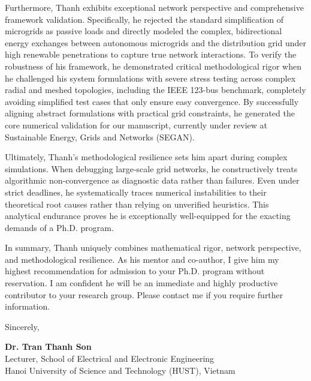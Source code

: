 \documentclass[11pt,letterpaper]{article}
\begin{document}
Furthermore, Thanh exhibits exceptional network perspective and comprehensive framework validation. Specifically, he rejected the standard simplification of microgrids as passive loads and directly modeled the complex, bidirectional energy exchanges between autonomous microgrids and the distribution grid under high renewable penetrations to capture true network interactions. To verify the robustness of his framework, he demonstrated critical methodological rigor when he challenged his system formulations with severe stress testing across complex radial and meshed topologies, including the IEEE 123-bus benchmark, completely avoiding simplified test cases that only ensure easy convergence. By successfully aligning abstract formulations with practical grid constraints, he generated the core numerical validation for our manuscript, currently under review at Sustainable Energy, Grids and Networks (SEGAN).

Ultimately, Thanh's methodological resilience sets him apart during complex simulations. When debugging large-scale grid networks, he constructively treats algorithmic non-convergence as diagnostic data rather than failures. Even under strict deadlines, he systematically traces numerical instabilities to their theoretical root causes rather than relying on unverified heuristics. This analytical endurance proves he is exceptionally well-equipped for the exacting demands of a Ph.D. program.

In summary, Thanh uniquely combines mathematical rigor, network perspective, and methodological resilience. As his mentor and co-author, I give him my highest recommendation for admission to your Ph.D. program without reservation. I am confident he will be an immediate and highly productive contributor to your research group. Please contact me if you require further information.

\noindent Sincerely,

\vspace{1.9cm}

\noindent \textbf{Dr. Tran Thanh Son}\\
\noindent Lecturer, School of Electrical and Electronic Engineering\\
\noindent Hanoi University of Science and Technology (HUST), Vietnam
\end{document}
